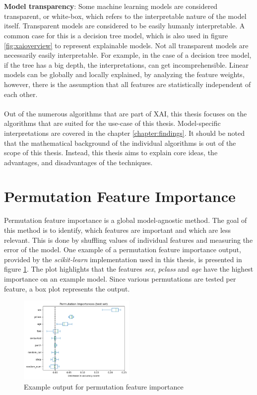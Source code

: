 \\\\
\textbf{Model transparency}: Some machine learning models are considered transparent, or white-box, which refers to the interpretable nature of the model itself. Transparent models are considered to be easily humanly interpretable. A common case for this is a decision tree model, which is also used in figure \ref{fig:xaioverview} to represent explainable models. Not all transparent models are necessarily easily interpretable. For example, in the case of a decision tree model, if the tree has a big depth, the interpretations, can get incomprehensible. Linear models can be globally and locally explained, by analyzing the feature weights, however, there is the assumption that all features are statistically independent of each other.
\\\\
Out of the numerous algorithms that are part of \ac{XAI}, this thesis focuses on the algorithms that are suited for the use-case of this thesis. Model-specific interpretations are covered in the chapter \ref{chapter:findings}. It should be noted that the mathematical background of the individual algorithms is out of the scope of this thesis. Instead, this thesis aims to explain core ideas, the advantages, and disadvantages of the techniques.

\section{Permutation Feature Importance}
Permutation feature importance is a global model-agnostic method. The goal of this method is to identify, which features are important and which are less relevant. This is done by shuffling values of individual features and measuring the error of the model. One example of a permutation feature importance output, provided by the \textit{scikit-learn} implementation \parencite{42Permut82:online} used in this thesis, is presented in figure \ref{fig:permimp}. The plot highlights that the features \textit{sex}, \textit{pclass} and \textit{age} have the highest importance on an example model. Since various permutations are tested per feature, a box plot represents the output. 

\begin{figure}[H]
      \centering
      \includegraphics[width=0.5\textwidth]{images/feature_importance.png}
      \caption{Example output for permutation feature importance \parencite{42Permut82:online}}
      \label{fig:permimp}
  \end{figure}

